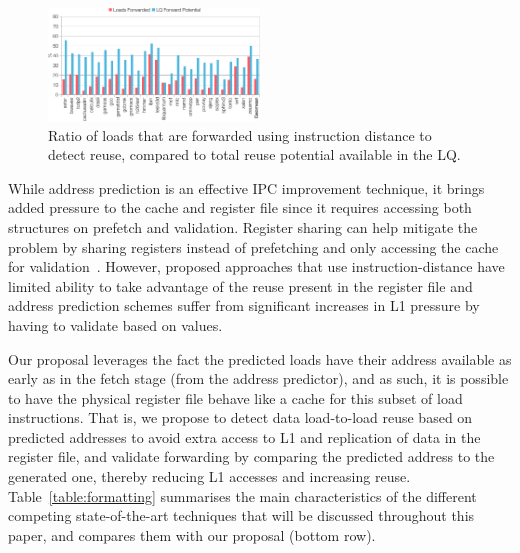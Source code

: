 \documentclass{sig-alternate}
\begin{document}
\begin{figure}[ht]
\centerline{\includegraphics[width=0.50\textwidth]{graphs/IDistVsPotential.pdf}}
\caption{Ratio of loads that are forwarded using instruction distance to detect reuse, compared to total reuse potential available in the LQ.}
\label{fig:IDistVsPotential}
\end{figure}


While address prediction is an effective IPC improvement technique, it brings added pressure to the cache and register file since it requires accessing both structures on prefetch and validation. Register sharing can help mitigate the problem by sharing registers instead of prefetching and only accessing the cache for validation~\cite{ISRB/perais16}. However, proposed approaches that use instruction-distance have limited ability to take advantage of the reuse present in the register file and address prediction schemes suffer from significant increases in L1 pressure by having to validate based on values. %

Our proposal leverages the fact the predicted loads have their address available as early as in the fetch stage (from the address predictor), and as such, it is possible to have the physical register file behave like a cache for this subset of load instructions. That is, we propose to detect data load-to-load reuse based on predicted addresses to avoid extra access to L1 and replication of data in the register file, and validate forwarding by comparing the predicted address to the generated one, thereby reducing L1 accesses and increasing reuse. Table~\ref{table:formatting} summarises the main characteristics of the different competing state-of-the-art techniques that will be discussed throughout this paper, and compares them with our proposal (bottom row).
\end{document}
